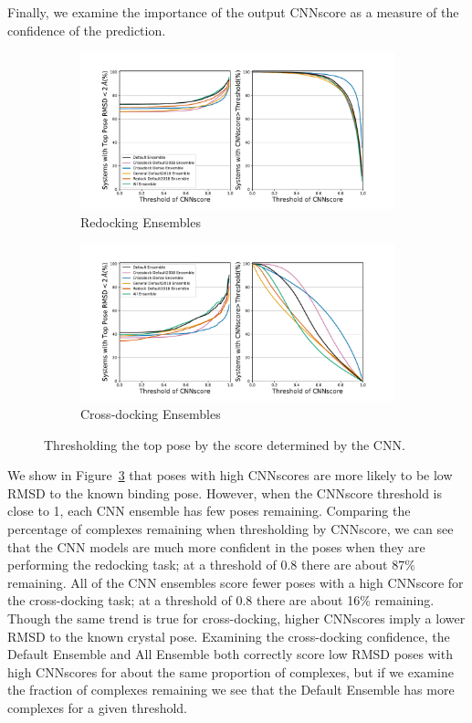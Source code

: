 \documentclass[journal=jcisd8,manuscript=article]{achemso}
\begin{document}
Finally, we examine the importance of the output CNNscore as a measure of the confidence of the prediction. 
\begin{figure}    
        \begin{subfigure}[b]{\textwidth}    
		\centering
		\includegraphics[width=\textwidth]{figures/redocking/thresh_cnnscore_ensembles.pdf}
		\caption{Redocking Ensembles}
		\label{fig:ThreshEnsRD}
        \end{subfigure}    
        \begin{subfigure}[b]{\textwidth}    
		\centering
		\includegraphics[width=\textwidth]{figures/crossdocking/thresh_cnnscore_ensembles.pdf}
		\caption{Cross-docking Ensembles}
                \label{fig:ThreshEnsCD}
        \end{subfigure}
	\caption{Thresholding the top pose by the score determined by the CNN.}
	\label{fig:ScoreThresh}
\end{figure} 
We show in Figure~\ref{fig:ScoreThresh} that poses with high CNNscores are more likely to be low RMSD to the known binding pose. However, when the CNNscore threshold is close to 1, each CNN ensemble has few poses remaining. Comparing the percentage of complexes remaining when thresholding by CNNscore, we can see that the CNN models are much more confident in the poses when they are performing the redocking task; at a threshold of 0.8 there are about 87\% remaining. All of the CNN ensembles score fewer poses with a high CNNscore for the cross-docking task; at a threshold of 0.8 there are about 16\% remaining. Though the same trend is true for cross-docking, higher CNNscores imply a lower RMSD to the known crystal pose. Examining the cross-docking confidence, the Default Ensemble and All Ensemble both correctly score low RMSD poses with high CNNscores for about the same proportion of complexes, but if we examine the fraction of complexes remaining we see that the Default Ensemble has more complexes for a given threshold.
\end{document}
